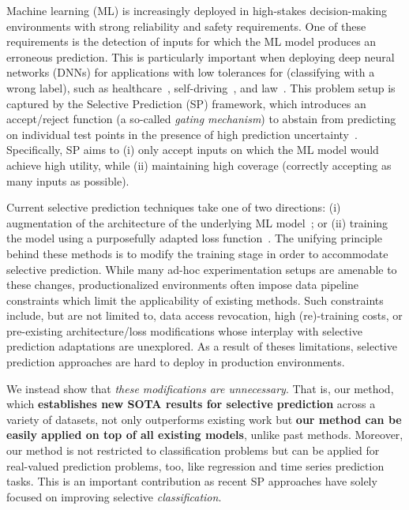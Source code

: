 Machine learning (ML) is increasingly deployed in high-stakes decision-making environments with strong reliability and safety requirements. One of these requirements is the detection of inputs for which the ML model produces an erroneous prediction. This is particularly important when deploying deep neural networks (DNNs) for applications with low tolerances for \fps (\ie classifying with a wrong label), such as healthcare~\citep{challen2019artificial, mozannar2020consistent}, self-driving~\citep{ghodsi2021generating}, and law~\citep{vieira2021understanding}.
This problem setup is captured by the Selective Prediction (SP) framework, which introduces an accept/reject function (a so-called \emph{gating mechanism}) to abstain from predicting on individual test points in the presence of high prediction uncertainty~\citep{geifman2017selective}. 
Specifically, SP aims to (i) only accept inputs on which the ML model would achieve high utility, while (ii) maintaining high coverage (\ie correctly accepting as many inputs as possible).

Current selective prediction techniques 
take one of two directions: (i) augmentation of the architecture of the underlying ML model~\citep{geifman2019selectivenet}; or (ii) training the model using a purposefully adapted loss function~\citep{liu2019deep, huang2020self, gangrade2021selective}. 
The unifying principle behind these methods is to modify the training stage in order to accommodate selective prediction. While many ad-hoc experimentation setups are amenable to these changes, productionalized environments often impose data pipeline constraints which limit the applicability of existing methods. Such constraints include, but are not limited to, data access revocation, high (re)-training costs, or pre-existing architecture/loss modifications whose interplay with selective prediction adaptations are unexplored. As a result of theses limitations, selective prediction approaches are hard to deploy in production environments.

We instead show that \textit{ these modifications are unnecessary}. That is, our method, which \textbf{establishes new SOTA results for selective prediction} across a variety of datasets, %
not only outperforms existing work but \textbf{our method can be easily applied on top of all existing models}, unlike past methods. Moreover, our method is not restricted to classification problems but can be applied for real-valued prediction problems, too, like regression and time series prediction tasks. This is an important contribution as recent SP approaches have solely focused on improving selective \emph{classification}.

